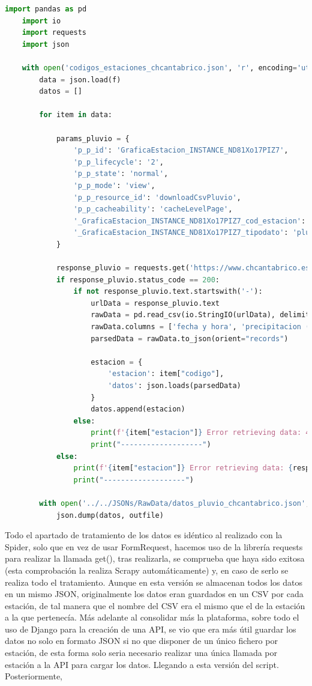 \begin{lstlisting}[language=Python, caption={Script de obtención de datos pluviometricos descartado}]
	import pandas as pd
	import io
	import requests
	import json
	
	with open('codigos_estaciones_chcantabrico.json', 'r', encoding='utf-8') as f:
		data = json.load(f)
		datos = []
		
		for item in data:

			params_pluvio = {
				'p_p_id': 'GraficaEstacion_INSTANCE_ND81Xo17PIZ7',
				'p_p_lifecycle': '2',
				'p_p_state': 'normal',
				'p_p_mode': 'view',
				'p_p_resource_id': 'downloadCsvPluvio',
				'p_p_cacheability': 'cacheLevelPage',
				'_GraficaEstacion_INSTANCE_ND81Xo17PIZ7_cod_estacion': f'{item["codigo"]}',
				'_GraficaEstacion_INSTANCE_ND81Xo17PIZ7_tipodato': 'pluvio',
			}
			
			response_pluvio = requests.get('https://www.chcantabrico.es/precipitacion-acumulada', params=params_pluvio)
			if response_pluvio.status_code == 200:
				if not response_pluvio.text.startswith('-'):
					urlData = response_pluvio.text
					rawData = pd.read_csv(io.StringIO(urlData), delimiter=';', encoding='utf-8', header=1)
					rawData.columns = ['fecha y hora', 'precipitacion (mm)']
					parsedData = rawData.to_json(orient="records")
					
					estacion = {
						'estacion': item["codigo"],
						'datos': json.loads(parsedData)
					}
					datos.append(estacion)
				else:
					print(f'{item["estacion"]} Error retrieving data: 404')
					print("-------------------")
			else:
				print(f'{item["estacion"]} Error retrieving data: {response_pluvio.status_code}')
				print("-------------------")
		
		with open('../../JSONs/RawData/datos_pluvio_chcantabrico.json', 'w', encoding='utf-8') as outfile:
			json.dump(datos, outfile)
\end{lstlisting}

Todo el apartado de tratamiento de los datos es idéntico al realizado con la Spider, solo que en vez de usar FormRequest, hacemos uso de la librería requests para realizar la llamada get(), tras realizarla, se comprueba que haya sido exitosa (esta comprobación la realiza Scrapy automáticamente) y, en caso de serlo se realiza todo el tratamiento.\newline
\newline
Aunque en esta versión se almacenan todos los datos en un mismo JSON, originalmente los datos eran guardados en un CSV por cada estación, de tal manera que el nombre del CSV era el mismo que el de la estación a la que pertenecía. Más adelante al consolidar más la plataforma, sobre todo el uso de Django para la creación de una API, se vio que era más útil guardar los datos no solo en formato JSON si no que disponer de un único fichero por estación, de esta forma solo seria necesario realizar una única llamada por estación a la API para cargar los datos. Llegando a esta versión del script.\newline
\newline
Posteriormente, 

